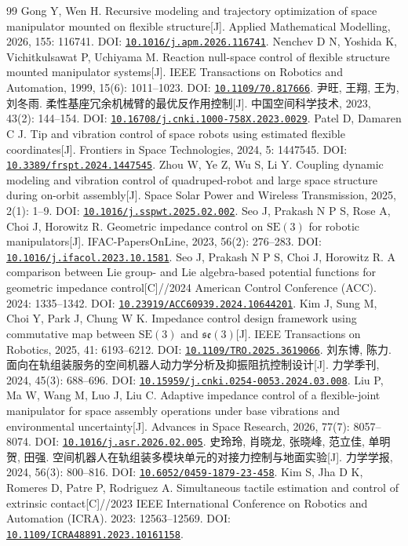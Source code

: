 \documentclass[UTF8,a4paper,zihao=-4,fontset=fandol]{ctexart}
\newcommand{\doi}[1]{\href{https://doi.org/#1}{\nolinkurl{#1}}}
\newcommand{\SE}{\mathrm{SE}(3)}
\begin{document}
\begin{thebibliography}{99}
 Gong Y, Wen H. Recursive modeling and trajectory optimization of space manipulator mounted on flexible structure[J]. Applied Mathematical Modelling, 2026, 155: 116741. DOI: \doi{10.1016/j.apm.2026.116741}.
 Nenchev D N, Yoshida K, Vichitkulsawat P, Uchiyama M. Reaction null-space control of flexible structure mounted manipulator systems[J]. IEEE Transactions on Robotics and Automation, 1999, 15(6): 1011--1023. DOI: \doi{10.1109/70.817666}.
 尹旺, 王翔, 王为, 刘冬雨. 柔性基座冗余机械臂的最优反作用控制[J]. 中国空间科学技术, 2023, 43(2): 144--154. DOI: \doi{10.16708/j.cnki.1000-758X.2023.0029}.
 Patel D, Damaren C J. Tip and vibration control of space robots using estimated flexible coordinates[J]. Frontiers in Space Technologies, 2024, 5: 1447545. DOI: \doi{10.3389/frspt.2024.1447545}.
 Zhou W, Ye Z, Wu S, Li Y. Coupling dynamic modeling and vibration control of quadruped-robot and large space structure during on-orbit assembly[J]. Space Solar Power and Wireless Transmission, 2025, 2(1): 1--9. DOI: \doi{10.1016/j.sspwt.2025.02.002}.
 Seo J, Prakash N P S, Rose A, Choi J, Horowitz R. Geometric impedance control on $\SE$ for robotic manipulators[J]. IFAC-PapersOnLine, 2023, 56(2): 276--283. DOI: \doi{10.1016/j.ifacol.2023.10.1581}.
 Seo J, Prakash N P S, Choi J, Horowitz R. A comparison between Lie group- and Lie algebra-based potential functions for geometric impedance control[C]//2024 American Control Conference (ACC). 2024: 1335--1342. DOI: \doi{10.23919/ACC60939.2024.10644201}.
 Kim J, Sung M, Choi Y, Park J, Chung W K. Impedance control design framework using commutative map between $\SE$ and $\mathfrak{se}(3)$[J]. IEEE Transactions on Robotics, 2025, 41: 6193--6212. DOI: \doi{10.1109/TRO.2025.3619066}.
 刘东博, 陈力. 面向在轨组装服务的空间机器人动力学分析及抑振阻抗控制设计[J]. 力学季刊, 2024, 45(3): 688--696. DOI: \doi{10.15959/j.cnki.0254-0053.2024.03.008}.
 Liu P, Ma W, Wang M, Luo J, Liu C. Adaptive impedance control of a flexible-joint manipulator for space assembly operations under base vibrations and environmental uncertainty[J]. Advances in Space Research, 2026, 77(7): 8057--8074. DOI: \doi{10.1016/j.asr.2026.02.005}.
 史玲玲, 肖晓龙, 张晓峰, 范立佳, 单明贺, 田强. 空间机器人在轨组装多模块单元的对接力控制与地面实验[J]. 力学学报, 2024, 56(3): 800--816. DOI: \doi{10.6052/0459-1879-23-458}.
 Kim S, Jha D K, Romeres D, Patre P, Rodriguez A. Simultaneous tactile estimation and control of extrinsic contact[C]//2023 IEEE International Conference on Robotics and Automation (ICRA). 2023: 12563--12569. DOI: \doi{10.1109/ICRA48891.2023.10161158}.

\end{thebibliography}
\end{document}
